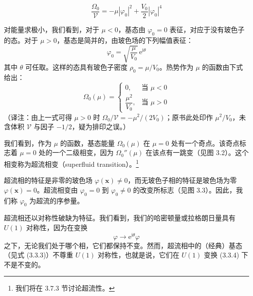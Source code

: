 \begin{equation*}
\frac{\Omega_0}{\mathcal{V}} = -\mu|\varphi_0|^2 + \frac{V_0}{2}|\varphi_0|^4
\end{equation*}


对能量求极小，我们看到，对于 $\mu < 0$，基态由 $\varphi_0 = 0$ 表征，对应于没有玻色子的态。对于 $\mu > 0$，基态是简并的，由玻色场的下列幅值表征：
\begin{equation*}
\varphi_0 = \sqrt{\frac{\mu}{V_0}}\,\mathrm{e}^{\mathrm{i}\theta}\tag{3.3.3}
\end{equation*}
其中 $\theta$ 可任取。这样的态具有玻色子密度 $\rho_0 = \mu/V_0$。热势作为 $\mu$ 的函数由下式给出：
\begin{equation*}
\Omega_0(\mu) =
\begin{cases}
0, & \text{当 } \mu < 0\\[6pt]
\dfrac{\mu^2}{V_0}, & \text{当 } \mu > 0
\end{cases}
\end{equation*}
（译注：由上一式可得 $\mu>0$ 时 $\Omega_0/\mathcal{V} = -\mu^2/(2V_0)$；原书此处印作 $\mu^2/V_0$，未含体积 $\mathcal{V}$ 与因子 $-1/2$，疑为排印之误。）

我们看到，作为 $\mu$ 的函数，基态能量 $\Omega_0(\mu)$ 在 $\mu = 0$ 处有一个奇点。该奇点标志着 $\mu = 0$ 处的一个二级相变，因为 $\Omega_0''(\mu)$ 在该点有一跳变（见图 3.2）。这个相变称为超流相变（superfluid transition）。\footnote{我们将在 3.7.3 节讨论超流性。}

超流相的特征是非零的玻色场 $\varphi(\pmb{x}) \neq 0$，而无玻色子相的特征是玻色场为零 $\varphi(\pmb{x}) = 0$。超流相变由 $\varphi_0 = 0$ 到 $\varphi_0 \neq 0$ 的改变所标志（见图 3.3）。因此，我们称 $\varphi_0$ 为超流的序参量。

超流相还以对称性破缺为特征。我们看到，我们的哈密顿量或拉格朗日量具有 $U(1)$ 对称性，因为在变换
\begin{equation*}
\varphi \rightarrow \mathrm{e}^{\mathrm{i}\theta}\varphi\tag{3.3.4}
\end{equation*}
之下，无论我们处于哪个相，它们都保持不变。然而，超流相中的（经典）基态（见式 (3.3.3)）不尊重 $U(1)$ 对称性，也就是说，它们在 $U(1)$ 变换 (3.3.4) 下不是不变的。

